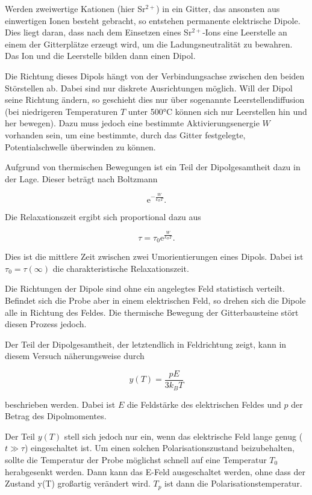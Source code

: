 Werden zweiwertige Kationen (hier Sr$^{2+}$) in ein Gitter, das ansonsten aus einwertigen Ionen besteht gebracht, so entstehen permanente
elektrische Dipole. Dies liegt daran, dass nach dem Einsetzen eines Sr$^{2+}$-Ions eine Leerstelle an einem der Gitterplätze
erzeugt wird, um die Ladungsneutralität zu bewahren. Das Ion und die Leerstelle bilden dann einen Dipol.

Die Richtung dieses Dipols hängt von der Verbindungsachse zwischen den beiden Störstellen ab. Dabei sind nur diskrete
Ausrichtungen möglich.
Will der Dipol seine Richtung ändern, so geschieht dies nur über sogenannte Leerstellendiffusion (bei niedrigeren Temperaturen $T$ unter
500°C können sich nur Leerstellen hin und her bewegen). Dazu muss jedoch eine bestimmte Aktivierungsenergie $W$ vorhanden sein,
um eine bestimmte, durch das Gitter festgelegte, Potentialschwelle überwinden zu können.

Aufgrund von thermischen Bewegungen ist ein Teil der Dipolgesamtheit dazu in der Lage. Dieser beträgt nach Boltzmann

\begin{equation}
	\mathrm{e}^{-\frac{W}{k_B T}} .
\end{equation}

Die Relaxationszeit ergibt sich proportional dazu aus

\begin{equation}
	\tau = \tau_0 \mathrm{e}^{\frac{W}{k_B T}} .
\end{equation}

Dies ist die mittlere Zeit zwischen zwei Umorientierungen eines Dipols. Dabei ist $\tau_0 = \tau(\infty)$ die charakteristische Relaxationszeit.

Die Richtungen der Dipole sind ohne ein angelegtes Feld statistisch verteilt. Befindet sich die Probe aber in einem
elektrischen Feld, so drehen sich die Dipole alle in Richtung des Feldes. Die thermische Bewegung der Gitterbausteine
stört diesen Prozess jedoch.

Der Teil der Dipolgesamtheit, der letztendlich in Feldrichtung zeigt, kann in diesem Versuch näherungsweise durch

\begin{equation}
	y(T) = \frac{p E}{3 k_B T}
\end{equation}

beschrieben werden. Dabei ist $E$ die Feldstärke des elektrischen Feldes und $p$ der Betrag des Dipolmomentes.

Der Teil $y(T)$ stell sich jedoch nur ein, wenn das elektrische Feld lange genug ($t \gg \tau$) eingeschaltet ist.
Um einen solchen Polarisationszustand beizubehalten, sollte die Temperatur der Probe möglichst schnell auf eine Temperatur $T_0$
herabgesenkt werden. Dann kann das E-Feld ausgeschaltet werden, ohne dass der Zustand y(T) großartig verändert wird.
$T_p$ ist dann die Polarisationstemperatur.

